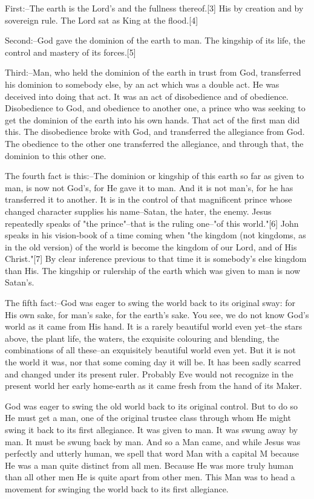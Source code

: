 First:--The earth is the Lord's and the fullness thereof.[3] His by
creation and by sovereign rule. The Lord sat as King at the flood.[4]

Second:--God gave the dominion of the earth to man. The kingship of its
life, the control and mastery of its forces.[5]

Third:--Man, who held the dominion of the earth in trust from God,
transferred his dominion to somebody else, by an act which was a double
act. He was deceived into doing that act. It was an act of disobedience
and of obedience. Disobedience to God, and obedience to another one, a
prince who was seeking to get the dominion of the earth into his own
hands. That act of the first man did this. The disobedience broke with
God, and transferred the allegiance from God. The obedience to the other
one transferred the allegiance, and through that, the dominion to this
other one.

The fourth fact is this:--The dominion or kingship of this earth so far
as given to man, is now not God's, for He gave it to man. And it is not
man's, for he has transferred it to another. It is in the control of that
magnificent prince whose changed character supplies his name--Satan, the
hater, the enemy. Jesus repeatedly speaks of "the prince"--that is the
ruling one--"of this world."[6] John speaks in his vision-book of a time
coming when "the kingdom (not kingdoms, as in the old version) of the
world is become the kingdom of our Lord, and of His Christ."[7] By clear
inference previous to that time it is somebody's else kingdom than His.
The kingship or rulership of the earth which was given to man is now
Satan's.

The fifth fact:--God was eager to swing the world back to its original
sway: for His own sake, for man's sake, for the earth's sake. You see, we
do not know God's world as it came from His hand. It is a rarely beautiful
world even yet--the stars above, the plant life, the waters, the exquisite
colouring and blending, the combinations of all these--an exquisitely
beautiful world even yet. But it is not the world it was, nor that some
coming day it will be. It has been sadly scarred and changed under its
present ruler. Probably Eve would not recognize in the present world her
early home-earth as it came fresh from the hand of its Maker.

God was eager to swing the old world back to its original control. But to
do so He must get a man, one of the original trustee class through whom He
might swing it back to its first allegiance. It was given to man. It was
swung away by man. It must be swung back by man. And so a Man came, and
while Jesus was perfectly and utterly human, we spell that word Man with a
capital M because He was a man quite distinct from all men. Because He was
more truly human than all other men He is quite apart from other men. This
Man was to head a movement for swinging the world back to its first
allegiance.

